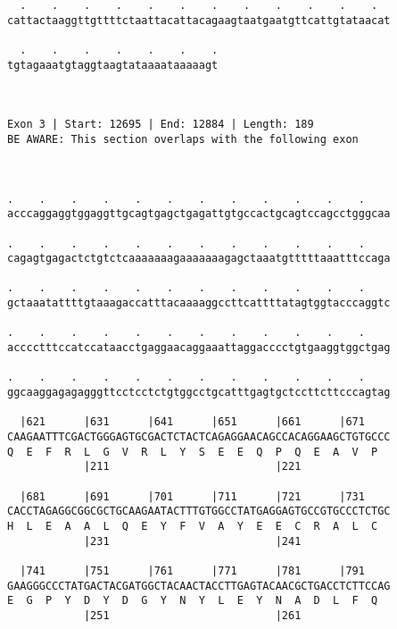 \documentclass{article}
\begin{document}
\begin{Verbatim}
  .    .    .    .    .    .    .    .    .    .    .    .  
cattactaaggttgttttctaattacattacagaagtaatgaatgttcattgtataacat
                                                            
  .    .    .    .    .    .    .
tgtagaaatgtaggtaagtataaaataaaaagt
                                 
                                 
 
Exon 3 | Start: 12695 | End: 12884 | Length: 189
BE AWARE: This section overlaps with the following exon



.    .    .    .    .    .    .    .    .    .    .    .    
acccaggaggtggaggttgcagtgagctgagattgtgccactgcagtccagcctgggcaa
                                                            
.    .    .    .    .    .    .    .    .    .    .    .    
cagagtgagactctgtctcaaaaaaagaaaaaaagagctaaatgtttttaaatttccaga
                                                            
.    .    .    .    .    .    .    .    .    .    .    .    
gctaaatattttgtaaagaccatttacaaaaggccttcattttatagtggtacccaggtc
                                                            
.    .    .    .    .    .    .    .    .    .    .    .    
acccctttccatccataacctgaggaacaggaaattaggacccctgtgaaggtggctgag
                                                            
.    .    .    .    .    .    .    .    .    .    .    .    
ggcaaggagagagggttcctcctctgtggcctgcatttgagtgctccttcttcccagtag
                                                            
  |621      |631      |641      |651      |661      |671    
CAAGAATTTCGACTGGGAGTGCGACTCTACTCAGAGGAACAGCCACAGGAAGCTGTGCCC
Q  E  F  R  L  G  V  R  L  Y  S  E  E  Q  P  Q  E  A  V  P  
            |211                          |221              
  
  |681      |691      |701      |711      |721      |731    
CACCTAGAGGCGGCGCTGCAAGAATACTTTGTGGCCTATGAGGAGTGCCGTGCCCTCTGC
H  L  E  A  A  L  Q  E  Y  F  V  A  Y  E  E  C  R  A  L  C  
            |231                          |241              
  
  |741      |751      |761      |771      |781      |791    
GAAGGGCCCTATGACTACGATGGCTACAACTACCTTGAGTACAACGCTGACCTCTTCCAG
E  G  P  Y  D  Y  D  G  Y  N  Y  L  E  Y  N  A  D  L  F  Q  
            |251                          |261              
  

\end{Verbatim}
\end{document}
